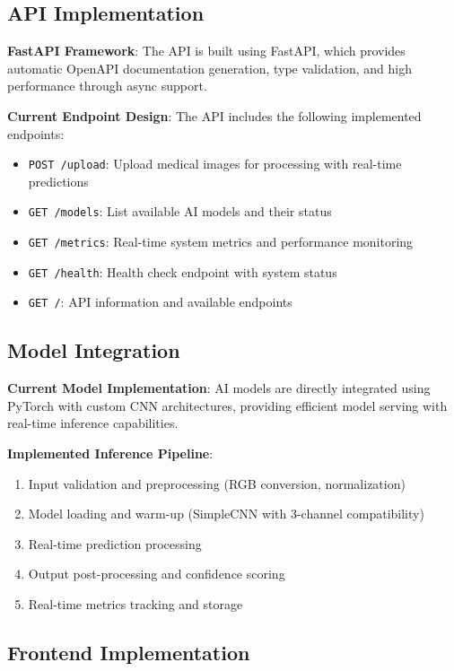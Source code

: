 \documentclass[12pt,a4paper]{article}
\begin{document}
\subsection{API Implementation}

\textbf{FastAPI Framework}: The API is built using FastAPI, which provides automatic OpenAPI documentation generation, type validation, and high performance through async support.

\textbf{Current Endpoint Design}: The API includes the following implemented endpoints:

\begin{itemize}
    \item \texttt{POST /upload}: Upload medical images for processing with real-time predictions
    \item \texttt{GET /models}: List available AI models and their status
    \item \texttt{GET /metrics}: Real-time system metrics and performance monitoring
    \item \texttt{GET /health}: Health check endpoint with system status
    \item \texttt{GET /}: API information and available endpoints
\end{itemize}

\subsection{Model Integration}

\textbf{Current Model Implementation}: AI models are directly integrated using PyTorch with custom CNN architectures, providing efficient model serving with real-time inference capabilities.

\textbf{Implemented Inference Pipeline}:
\begin{enumerate}
    \item Input validation and preprocessing (RGB conversion, normalization)
    \item Model loading and warm-up (SimpleCNN with 3-channel compatibility)
    \item Real-time prediction processing
    \item Output post-processing and confidence scoring
    \item Real-time metrics tracking and storage
\end{enumerate}

\subsection{Frontend Implementation}
\end{document}
